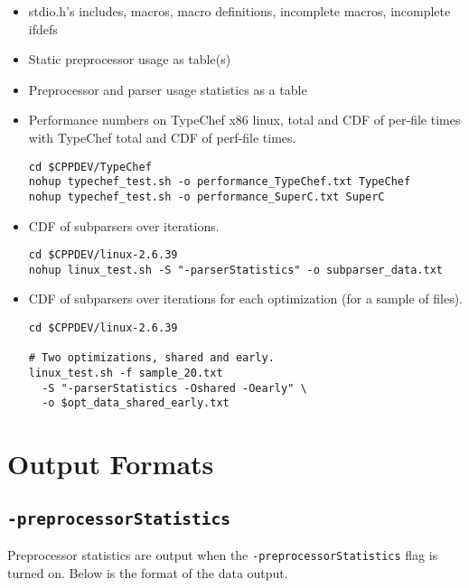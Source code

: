 \documentclass{report}
\begin{document}
\begin{itemize}
\item stdio.h's includes, macros, macro definitions, incomplete macros,
  incomplete ifdefs
\item Static preprocessor usage as table(s)
\item Preprocessor and parser usage statistics as a table
\item Performance numbers on TypeChef x86 linux, total and CDF of
  per-file times with TypeChef total and CDF of perf-file times.
\begin{verbatim}
cd $CPPDEV/TypeChef
nohup typechef_test.sh -o performance_TypeChef.txt TypeChef
nohup typechef_test.sh -o performance_SuperC.txt SuperC
\end{verbatim}
\item CDF of subparsers over iterations.
\begin{verbatim}
cd $CPPDEV/linux-2.6.39
nohup linux_test.sh -S "-parserStatistics" -o subparser_data.txt
\end{verbatim}
\item CDF of subparsers over iterations for each optimization (for a
  sample of files).
\begin{verbatim}
cd $CPPDEV/linux-2.6.39

# Two optimizations, shared and early.
linux_test.sh -f sample_20.txt
  -S "-parserStatistics -Oshared -Oearly" \
  -o $opt_data_shared_early.txt

\end{verbatim}
\end{itemize}



\section{Output Formats}

\subsection*{\texttt{-preprocessorStatistics}}

Preprocessor statistics are output when the \verb"-preprocessorStatistics"
flag is turned on.  Below is the format of the data output.
\end{document}
